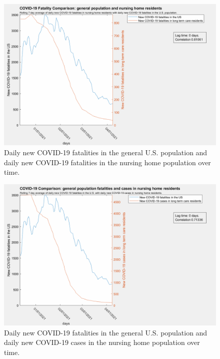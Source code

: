 \documentclass[twoside]{article}
\begin{document}
\begin{multicols}{2}
\begin{figure}[H]
	\includegraphics[width=\linewidth]{images/usa_nursing_fatalities-0lag.png}
	\caption{Daily new COVID-19 fatalities in the general U.S. population and daily new COVID-19 fatalities in the nursing home population over time. }
	\label{fig:images/usa_nursing_fatalities-0lagLabel}
\end{figure}

\begin{figure}[H]
	\includegraphics[width=\linewidth]{images/usaFatalities_nursingCases-0lag.png}
	\caption{Daily new COVID-19 fatalities in the general U.S. population and daily new COVID-19 cases in the nursing home population over time.}
	\label{fig:images/usaFatalities_nursingCases-0lagLabel}
\end{figure}


\end{multicols}
\end{document}
